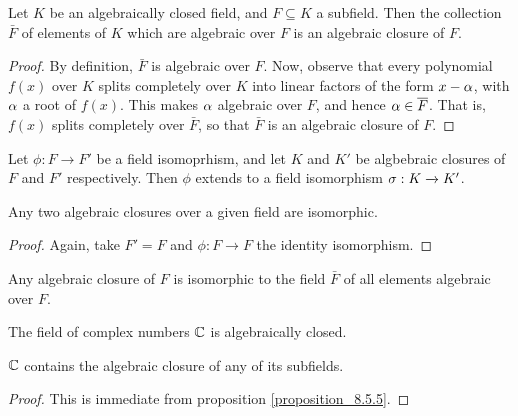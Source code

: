\begin{proposition}\label{proposition_8.5.5}
  Let $K$ be an algebraically closed field, and $F \subseteq K$ a
  subfield. Then the collection $\bar{F}$ of elements of $K$ which are
  algebraic over $F$ is an algebraic closure of $F$.
\end{proposition}
\begin{proof}
  By definition, $\bar{F}$ is algebraic over $F$. Now, observe that
  every polynomial $f(x)$ over $K$ splits completely over  $K$ into
  linear factors of the form  $x-\alpha$, with  $\alpha$ a root of  $f(x)$.
  This makes $\alpha$ algebraic over  $F$, and hence  $\alpha \in \overline{F}$.
  That is, $f(x)$ splits completely over $\bar{F}$, so that $\bar{F}$
  is an algebraic closure of $F$.
\end{proof}

\begin{proposition}
  Let $\phi:F \xrightarrow{} F'$ be a field isomoprhism, and let $K$
  and $K'$ be algbebraic closures of $F$ and $F'$ respectively. Then
  $\phi$ extends to a field isomorphism $\sigma:K \xrightarrow{} K'$.
\end{proposition}
\begin{corollory}
  Any two algebraic closures over a given field are isomorphic.
\end{corollory}
\begin{proof}
  Again, take $F'=F$ and $\phi:F \xrightarrow{} F$ the identity
  isomorphism.
\end{proof}
\begin{corollary}
  Any algebraic closure of $F$ is isomorphic to the field $\bar{F}$ of
  all elements algebraic over $F$.
\end{corollary}

\begin{theorem}\label{theorem_8.5.7}
  The field of complex numbers $\mathbb{C}$ is algebraically closed.
\end{theorem}
\begin{corollary}
  $\mathbb{C}$ contains the algebraic closure of any of its subfields.
\end{corollary}
\begin{proof}
  This is immediate from proposition \ref{proposition_8.5.5}.
\end{proof}
